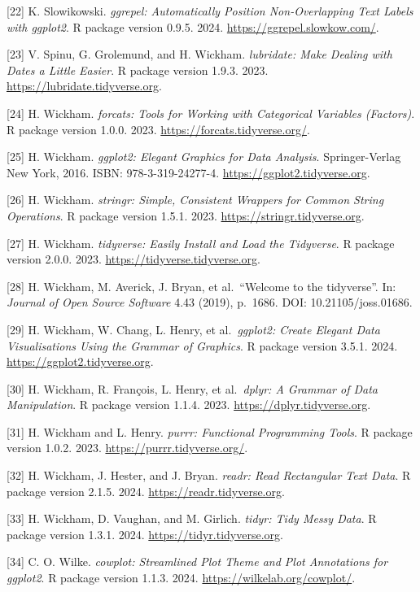 \documentclass[
  letterpaper,
  DIV=11,
  numbers=noendperiod]{scrreprt}
\begin{document}
{[}22{]} K. Slowikowski. \emph{ggrepel: Automatically Position
Non-Overlapping Text Labels with ggplot2}. R package version 0.9.5.
2024. \url{https://ggrepel.slowkow.com/}.

{[}23{]} V. Spinu, G. Grolemund, and H. Wickham. \emph{lubridate: Make
Dealing with Dates a Little Easier}. R package version 1.9.3. 2023.
\url{https://lubridate.tidyverse.org}.

{[}24{]} H. Wickham. \emph{forcats: Tools for Working with Categorical
Variables (Factors)}. R package version 1.0.0. 2023.
\url{https://forcats.tidyverse.org/}.

{[}25{]} H. Wickham. \emph{ggplot2: Elegant Graphics for Data Analysis}.
Springer-Verlag New York, 2016. ISBN: 978-3-319-24277-4.
\url{https://ggplot2.tidyverse.org}.

{[}26{]} H. Wickham. \emph{stringr: Simple, Consistent Wrappers for
Common String Operations}. R package version 1.5.1. 2023.
\url{https://stringr.tidyverse.org}.

{[}27{]} H. Wickham. \emph{tidyverse: Easily Install and Load the
Tidyverse}. R package version 2.0.0. 2023.
\url{https://tidyverse.tidyverse.org}.

{[}28{]} H. Wickham, M. Averick, J. Bryan, et al.~``Welcome to the
tidyverse''. In: \emph{Journal of Open Source Software} 4.43 (2019),
p.~1686. DOI: 10.21105/joss.01686.

{[}29{]} H. Wickham, W. Chang, L. Henry, et al.~\emph{ggplot2: Create
Elegant Data Visualisations Using the Grammar of Graphics}. R package
version 3.5.1. 2024. \url{https://ggplot2.tidyverse.org}.

{[}30{]} H. Wickham, R. François, L. Henry, et al.~\emph{dplyr: A
Grammar of Data Manipulation}. R package version 1.1.4. 2023.
\url{https://dplyr.tidyverse.org}.

{[}31{]} H. Wickham and L. Henry. \emph{purrr: Functional Programming
Tools}. R package version 1.0.2. 2023.
\url{https://purrr.tidyverse.org/}.

{[}32{]} H. Wickham, J. Hester, and J. Bryan. \emph{readr: Read
Rectangular Text Data}. R package version 2.1.5. 2024.
\url{https://readr.tidyverse.org}.

{[}33{]} H. Wickham, D. Vaughan, and M. Girlich. \emph{tidyr: Tidy Messy
Data}. R package version 1.3.1. 2024. \url{https://tidyr.tidyverse.org}.

{[}34{]} C. O. Wilke. \emph{cowplot: Streamlined Plot Theme and Plot
Annotations for ggplot2}. R package version 1.1.3. 2024.
\url{https://wilkelab.org/cowplot/}.
\end{document}
